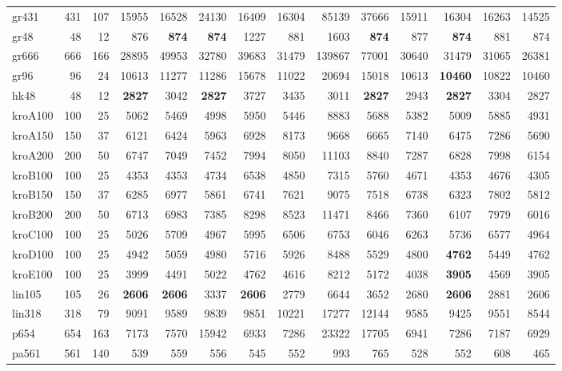{\begin{longtable}{l r r r r r r r r r r r r r}
gr431 & 431 & 107 & 15955 & 16528 & 24130 & 16409 & 16304 & 85139 & 37666 & 15911 & 16304 & 16263 & 14525 \\
gr48 & 48 & 12 & 876 & \textbf{874} & \textbf{874} & 1227 & 881 & 1603 & \textbf{874} & 877 & \textbf{874} & 881 & 874 \\
gr666 & 666 & 166 & 28895 & 49953 & 32780 & 39683 & 31479 & 139867 & 77001 & 30640 & 31479 & 31065 & 26381 \\
gr96 & 96 & 24 & 10613 & 11277 & 11286 & 15678 & 11022 & 20694 & 15018 & 10613 & \textbf{10460} & 10822 & 10460 \\
hk48 & 48 & 12 & \textbf{2827} & 3042 & \textbf{2827} & 3727 & 3435 & 3011 & \textbf{2827} & 2943 & \textbf{2827} & 3304 & 2827 \\
kroA100 & 100 & 25 & 5062 & 5469 & 4998 & 5950 & 5446 & 8883 & 5688 & 5382 & 5009 & 5885 & 4931 \\
kroA150 & 150 & 37 & 6121 & 6424 & 5963 & 6928 & 8173 & 9668 & 6665 & 7140 & 6475 & 7286 & 5690 \\
kroA200 & 200 & 50 & 6747 & 7049 & 7452 & 7994 & 8050 & 11103 & 8840 & 7287 & 6828 & 7998 & 6154 \\
kroB100 & 100 & 25 & 4353 & 4353 & 4734 & 6538 & 4850 & 7315 & 5760 & 4671 & 4353 & 4676 & 4305 \\
kroB150 & 150 & 37 & 6285 & 6977 & 5861 & 6741 & 7621 & 9075 & 7518 & 6738 & 6323 & 7802 & 5812 \\
kroB200 & 200 & 50 & 6713 & 6983 & 7385 & 8298 & 8523 & 11471 & 8466 & 7360 & 6107 & 7979 & 6016 \\
kroC100 & 100 & 25 & 5026 & 5709 & 4967 & 5995 & 6506 & 6753 & 6046 & 6263 & 5736 & 6577 & 4964 \\
kroD100 & 100 & 25 & 4942 & 5059 & 4980 & 5716 & 5926 & 8488 & 5529 & 4800 & \textbf{4762} & 5449 & 4762 \\
kroE100 & 100 & 25 & 3999 & 4491 & 5022 & 4762 & 4616 & 8212 & 5172 & 4038 & \textbf{3905} & 4569 & 3905 \\
lin105 & 105 & 26 & \textbf{2606} & \textbf{2606} & 3337 & \textbf{2606} & 2779 & 6644 & 3652 & 2680 & \textbf{2606} & 2881 & 2606 \\
lin318 & 318 & 79 & 9091 & 9589 & 9839 & 9851 & 10221 & 17277 & 12144 & 9585 & 9425 & 9551 & 8544 \\
p654 & 654 & 163 & 7173 & 7570 & 15942 & 6933 & 7286 & 23322 & 17705 & 6941 & 7286 & 7187 & 6929 \\
pa561 & 561 & 140 & 539 & 559 & 556 & 545 & 552 & 993 & 765 & 528 & 552 & 608 & 465 \\

\end{longtable}}
